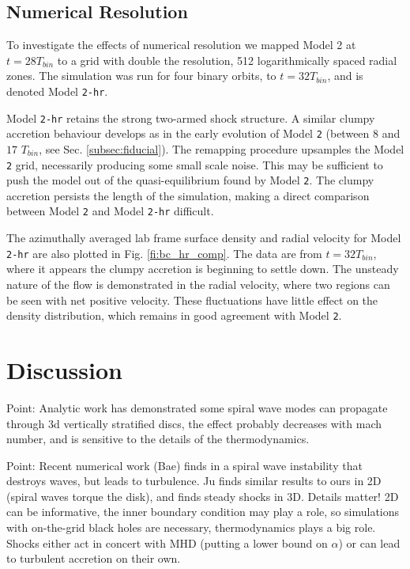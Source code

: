 \documentclass{emulateapj}
\newcommand{\model}[1]{{Model \texttt{#1}}}
\begin{document}
\subsection{Numerical Resolution}
\label{subsec:res}

To investigate the effects of numerical resolution we mapped Model 2 at $t=28T_{bin}$ to a grid with double the resolution, 512 logarithmically spaced radial zones.  The simulation was run for four binary orbits, to $t = 32 T_{bin}$, and is denoted Model \texttt{2-hr}.

Model \texttt{2-hr} retains the strong two-armed shock structure. A similar clumpy accretion behaviour develops as in the early evolution of \model{2} (between $8$ and $17$ $T_{bin}$, see Sec. \ref{subsec:fiducial}).  The remapping procedure upsamples the \model{2} grid, necessarily producing some small scale noise.  This may be sufficient to push the model out of the quasi-equilibrium found by \model{2}. The clumpy accretion persists the length of the simulation, making a direct comparison between \model{2} and \model{2-hr} difficult.

The azimuthally averaged lab frame surface density and radial velocity for \model{2-hr} are also plotted in Fig. \ref{fi:bc_hr_comp}.  The data are from $t = 32T_{bin}$, where it appears the clumpy accretion is beginning to settle down.  The unsteady nature of the flow is demonstrated in the radial velocity, where two regions can be seen with net positive velocity.  These fluctuations have little effect on the density distribution, which remains in good agreement with \model{2}.



\section{Discussion}
\label{sec:discussion}


Point: Analytic work has demonstrated some spiral wave modes can propagate through 3d vertically stratified discs, the effect probably decreases with mach number, and is sensitive to the details of the thermodynamics.

Point:  Recent numerical work (Bae) finds in a spiral wave instability that destroys waves, but leads to turbulence.  Ju finds similar results to ours in 2D (spiral waves torque the disk), and finds steady shocks in 3D.  Details matter!  2D can be informative, the inner boundary condition may play a role, so simulations with on-the-grid black holes are necessary, thermodynamics plays a big role.  Shocks either act in concert with MHD (putting a lower bound on $\alpha$) or can lead to turbulent accretion on their own.
\end{document}
